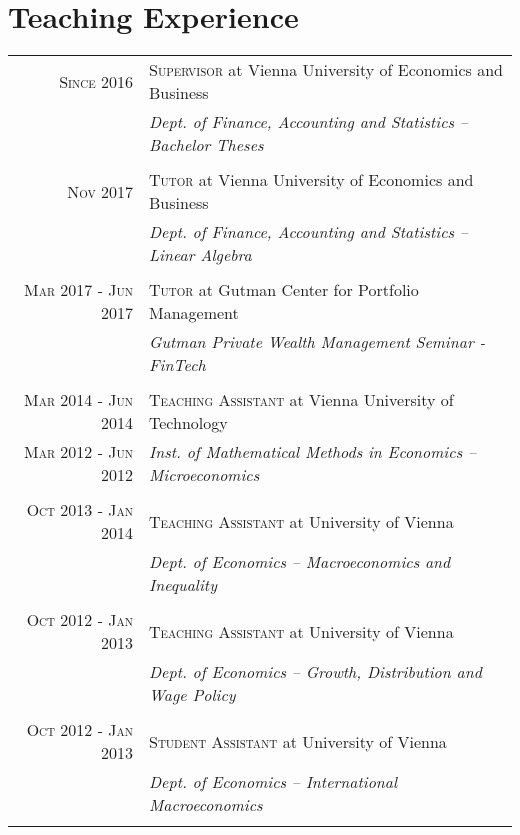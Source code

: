 \documentclass[a4paper,11pt]{article}
\begin{document}
\section{Teaching Experience}
\centering
\begin{tabularx}{0.99\linewidth}{r|p{11cm}}
	
	\textsc{Since 2016} & \textsc{Supervisor} at Vienna University of Economics and Business \\
	& \emph{Dept. of Finance, Accounting and Statistics -- Bachelor Theses}\\
	\multicolumn{2}{c}{} \\
	
	\textsc{Nov 2017} & \textsc{Tutor} at Vienna University of Economics and Business \\
	& \emph{Dept. of Finance, Accounting and Statistics -- Linear Algebra}\\
	\multicolumn{2}{c}{} \\
	
	\textsc{Mar 2017 - Jun 2017} & \textsc{Tutor} at Gutman Center for Portfolio Management\\
	& \emph{Gutman Private Wealth Management Seminar - FinTech}\\
	\multicolumn{2}{c}{} \\

	\textsc{Mar 2014 - Jun 2014} & \textsc{Teaching Assistant} at Vienna University of Technology\\
	\textsc{Mar 2012 - Jun 2012}& \emph{Inst. of Mathematical Methods in Economics -- Microeconomics}\\
	\multicolumn{2}{c}{}\\

	\textsc{Oct 2013 - Jan 2014} & \textsc{Teaching Assistant} at University of Vienna\\
	& \emph{Dept. of Economics -- Macroeconomics and Inequality}\\
	\multicolumn{2}{c}{} \\
	
	\textsc{Oct 2012 - Jan 2013} & \textsc{Teaching Assistant} at University of Vienna\\
	& \emph{Dept. of Economics -- Growth, Distribution and Wage Policy}\\
	\multicolumn{2}{c}{}\\

	\textsc{Oct 2012 - Jan 2013} & \textsc{Student Assistant} at University of Vienna\\
	& \emph{Dept. of Economics -- International Macroeconomics}\\
	\multicolumn{2}{c}{}
	
\end{tabularx}
\end{document}
